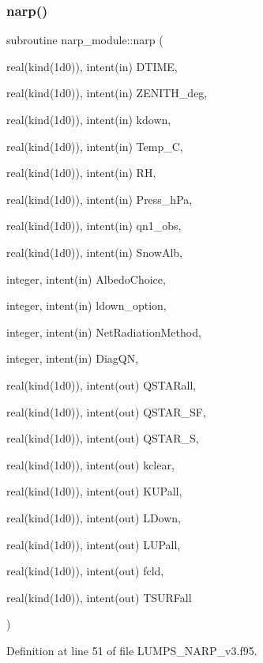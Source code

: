 \subsubsection{\texorpdfstring{narp()}{narp()}}
{\footnotesize\ttfamily subroutine narp\+\_\+module\+::narp (\begin{DoxyParamCaption}\item[{real(kind(1d0)), intent(in)}]{D\+T\+I\+ME,  }\item[{real(kind(1d0)), intent(in)}]{Z\+E\+N\+I\+T\+H\+\_\+deg,  }\item[{real(kind(1d0)), intent(in)}]{kdown,  }\item[{real(kind(1d0)), intent(in)}]{Temp\+\_\+C,  }\item[{real(kind(1d0)), intent(in)}]{RH,  }\item[{real(kind(1d0)), intent(in)}]{Press\+\_\+h\+Pa,  }\item[{real(kind(1d0)), intent(in)}]{qn1\+\_\+obs,  }\item[{real(kind(1d0)), intent(in)}]{Snow\+Alb,  }\item[{integer, intent(in)}]{Albedo\+Choice,  }\item[{integer, intent(in)}]{ldown\+\_\+option,  }\item[{integer, intent(in)}]{Net\+Radiation\+Method,  }\item[{integer, intent(in)}]{Diag\+QN,  }\item[{real(kind(1d0)), intent(out)}]{Q\+S\+T\+A\+Rall,  }\item[{real(kind(1d0)), intent(out)}]{Q\+S\+T\+A\+R\+\_\+\+SF,  }\item[{real(kind(1d0)), intent(out)}]{Q\+S\+T\+A\+R\+\_\+S,  }\item[{real(kind(1d0)), intent(out)}]{kclear,  }\item[{real(kind(1d0)), intent(out)}]{K\+U\+Pall,  }\item[{real(kind(1d0)), intent(out)}]{L\+Down,  }\item[{real(kind(1d0)), intent(out)}]{L\+U\+Pall,  }\item[{real(kind(1d0)), intent(out)}]{fcld,  }\item[{real(kind(1d0)), intent(out)}]{T\+S\+U\+R\+Fall }\end{DoxyParamCaption})}



Definition at line 51 of file L\+U\+M\+P\+S\+\_\+\+N\+A\+R\+P\+\_\+v3.\+f95.

